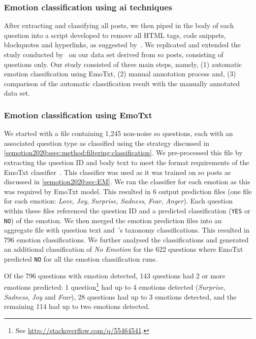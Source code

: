\subsubsection{Emotion classification using \gls{ai} techniques}

After extracting and classifying all posts, we then piped in the body of each question into a script developed to remove all HTML tags, code snippets, blockquotes and hyperlinks, as suggested by~\citet{novielli2018}. We replicated and extended the study conducted by~\citet{novielli2018} on our data set derived from \SEMNumPostsFromSO{} \gls{so} posts, consisting of questions only. Our study consisted of three main steps, namely, (1) automatic emotion classification using EmoTxt, (2) manual annotation process and, (3) comparison of the automatic classification result with the manually annotated data set.

\subsubsection{Emotion classification using EmoTxt}
We started with a file containing 1,245 non-noise \gls{so} questions, each with an associated question type as classified using the strategy discussed in \cref{semotion2020:ssec:method:filtering:classification}. We pre-processed this file by extracting the question ID and body text to meet the format requirements of the EmoTxt classifier~\citep{calefato2017}. This classifier was used as it was trained on \gls{so} posts as discussed in \cref{semotion2020:sec:EM}. We ran the classifier for each emotion as this was required by EmoTxt model.  This resulted in 6 output prediction files (one file for each emotion: \textit{Love}, \textit{Joy}, \textit{Surprise}, \textit{Sadness}, \textit{Fear}, \textit{Anger}). Each question within these files referenced the question ID and a predicted classification (\texttt{YES} or \texttt{NO}) of the emotion.  We then merged the emotion prediction files into an aggregate file with question text and~\citeauthor{Beyer:2018fm}'s taxonomy classifications. This resulted in 796 emotion classifications. We further analysed the classifications and generated an additional classification of \textit{No Emotion} for the 622 questions where EmoTxt predicted \texttt{NO} for all the emotion classification runs.

Of the 796 questions with emotion detected, 143 questions had 2 or more emotions predicted: 1 question\footnote{See \url{http://stackoverflow.com/q/55464541}.} had up to 4 emotions detected (\textit{Surprise}, \textit{Sadness}, \textit{Joy} and \textit{Fear}), 28 questions had up to 3 emotions detected, and the remaining 114 had up to two emotions detected.

